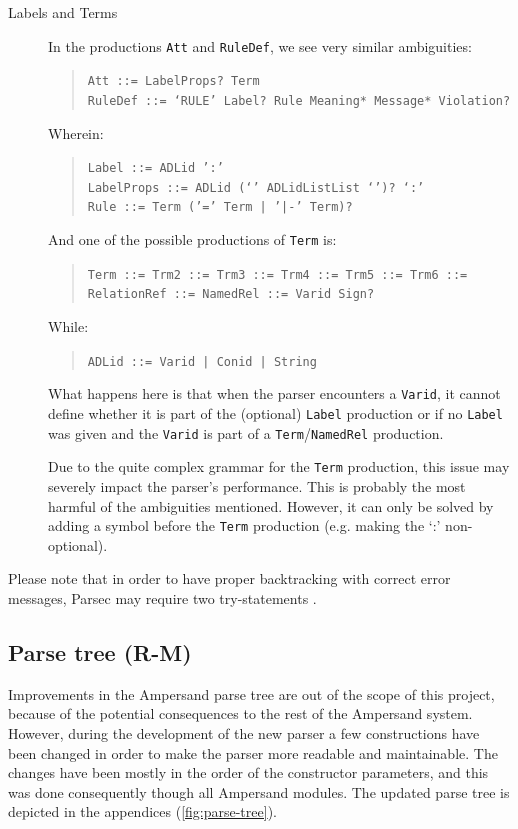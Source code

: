 \begin{description}
  \item[Labels and Terms]
    In the productions \texttt{Att} and \texttt{RuleDef}, we see very similar ambiguities:
    \begin{quote}
        \texttt{Att ::= LabelProps? Term}\\
        \texttt{RuleDef ::= `RULE' Label? Rule Meaning* Message* Violation?}
    \end{quote}
    Wherein:
    \begin{quote}
        \texttt{Label ::= ADLid ':'}\\
        \texttt{LabelProps ::= ADLid (`{' ADLidListList `}')? `:'}\\
        \texttt{Rule ::= Term ('=' Term | '|-' Term)?}
    \end{quote}
    And one of the possible productions of \texttt{Term} is:
    \begin{quote}
        \texttt{Term ::= Trm2 ::= Trm3 ::= Trm4 ::= Trm5 ::= Trm6 ::= RelationRef ::= NamedRel ::= Varid Sign?}
    \end{quote}
    While:
    \begin{quote}
        \texttt{ADLid ::= Varid | Conid | String}
    \end{quote}
    
    What happens here is that when the parser encounters a \texttt{Varid}, it cannot define whether it is part of the (optional) \texttt{Label} production or if no \texttt{Label} was given and the \texttt{Varid} is part of a \texttt{Term}/\texttt{NamedRel} production.
    
    Due to the quite complex grammar for the \texttt{Term} production, this issue may severely impact the parser's performance.
    This is probably the most harmful of the ambiguities mentioned.
    However, it can only be solved by adding a symbol before the \texttt{Term} production (e.g. making the `:' non-optional).
\end{description}
%
Please note that in order to have proper backtracking with correct error messages, Parsec may require two try-statements .

\subsection{Parse tree (R-M)}
\label{subsec:design-parse-tree}
Improvements in the Ampersand parse tree are out of the scope of this project, because of the potential consequences to the rest of the Ampersand system.
However, during the development of the new parser a few constructions have been changed in order to make the parser more readable and maintainable.
The changes have been mostly in the order of the constructor parameters, and this was done consequently though all Ampersand modules.
The updated parse tree is depicted in the appendices (\autoref{fig:parse-tree}).

